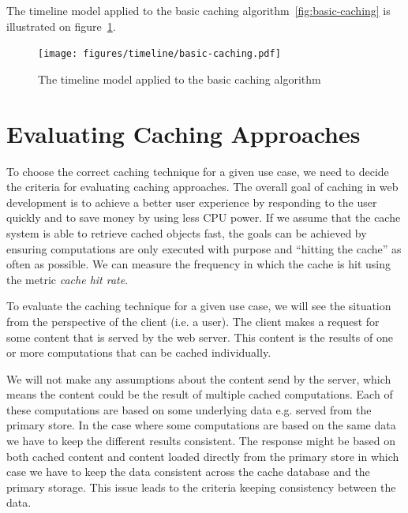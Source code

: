 The timeline model applied to the basic caching algorithm~\ref{fig:basic-caching} is illustrated on figure~\ref{fig:basic-caching-timeline}.

\begin{figure}[ht!]
  \centering
  \texttt{[image: figures/timeline/basic-caching.pdf]}
  \caption{The timeline model applied to the basic caching algorithm}
  \label{fig:basic-caching-timeline}
\end{figure}



\section{Evaluating Caching Approaches}
\label{sec:evaluating_caching_techniques}


To choose the correct caching technique for a given use case, we need to decide the criteria for evaluating caching approaches. The overall goal of caching in web development is to achieve a better user experience by responding to the user quickly and to save money by using less CPU power. If we assume that the cache system is able to retrieve cached objects fast, the goals can be achieved by ensuring computations are only executed with purpose and ``hitting the cache'' as often as possible. We can measure the frequency in which the cache is hit using the metric \emph{cache hit rate}.



To evaluate the caching technique for a given use case, we will see the situation from the perspective of the client (i.e. a user). The client makes a request for some content that is served by the web server. This content is the results of one or more computations that can be cached individually.


We will not make any assumptions about the content send by the server, which means the content could be the result of multiple cached computations. Each of these computations are based on some underlying data e.g. served from the primary store. In the case where some computations are based on the same data we have to keep the different results consistent. The response might be based on both cached content and content loaded directly from the primary store in which case we have to keep the data consistent across the cache database and the primary storage. This issue leads to the criteria keeping consistency between the data.

